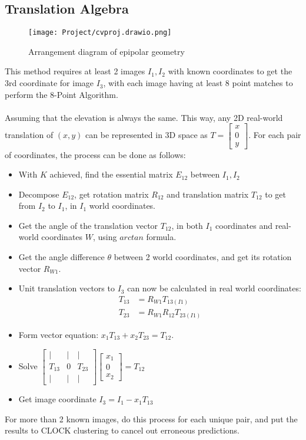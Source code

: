 \documentclass[11pt]{article}
\begin{document}
\begin{multicols}{2}
\subsection{Translation Algebra}
\begin{figure}[H]
    \centering
    \texttt{[image: Project/cvproj.drawio.png]}
    \vspace{-1.5cm}\caption{Arrangement diagram of epipolar geometry}
    \label{fig:translation}
\end{figure}
\noindent This method requires at least 2 images $I_1,I_2$ with known coordinates to get the 3rd coordinate for image $I_3$, with each image having at least 8 point matches to perform the 8-Point Algorithm. \\~\\
\columnbreak
Assuming that the elevation is always the same. This way, any 2D real-world translation of $(x,y)$ can be represented in 3D space as $T = \begin{bmatrix}
x\\0\\y
\end{bmatrix}$. For each pair of coordinates, the process can be done as follows:
\begin{itemize}
    \item With $K$ achieved, find the essential matrix $E_{12}$ between $I_1,I_2$
    \item Decompose $E_{12}$, get rotation matrix $R_{12}$ and translation matrix $T_{12}$ to get from $I_2$ to $I_1$, in $I_1$ world coordinates.
    \item Get the angle of the translation vector $T_{12}$, in both $I_1$ coordinates and real-world coordinates $W$, using $arctan$ formula.
    \item Get the angle difference $\theta$ between 2 world coordinates, and get its rotation vector $R_{W1}$.
    \item Unit translation vectors to $I_3$ can now be calculated in real world coordinates: 
    \begin{align*}
        T_{13} &= R_{W1}T_{13 (I1)}\\
        T_{23} &= R_{W1}R_{12}T_{23 (I1)}
    \end{align*}
    \item Form vector equation: $x_1T_{13} + x_2T_{23} = T_{12}$. 
    \item Solve $\begin{bmatrix}
    \vert & \vert & \vert \\
    T_{13} & 0 & T_{23}\\
    \vert & \vert & \vert 
    \end{bmatrix}
    \begin{bmatrix}
    x_1\\0\\
    x_2
    \end{bmatrix} = T_{12}$
    \item Get image coordinate $I_3 = I_1 - x_1T_{13}$
\end{itemize}

\noindent For more than 2 known images, do this process for each unique pair, and put the results to CLOCK clustering to cancel out erroneous predictions.

\end{multicols}
\end{document}
